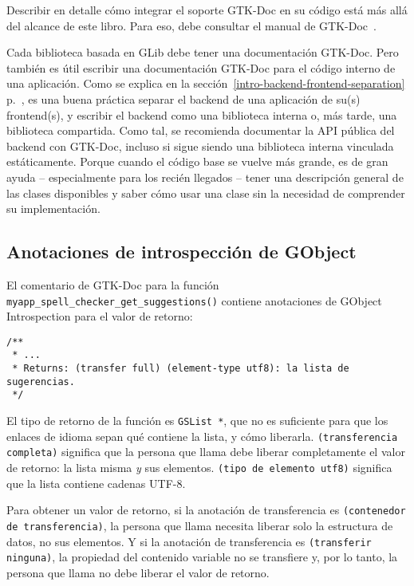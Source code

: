 Describir en detalle cómo integrar el soporte GTK-Doc en su código está más allá del alcance de este libro. Para eso, debe consultar el manual de GTK-Doc~\cite{gtk-doc}.

Cada biblioteca basada en GLib debe tener una documentación GTK-Doc. Pero también es útil escribir una documentación GTK-Doc para el código interno de una aplicación. Como se explica en la sección~\ref{intro-backend-frontend-separation} p.~\pageref{intro-backend-frontend-separation}, es una buena práctica separar el backend de una aplicación de su(s) frontend(s), y escribir el backend como una biblioteca interna o, más tarde, una biblioteca compartida. Como tal, se recomienda documentar la API pública del backend con GTK-Doc, incluso si sigue siendo una biblioteca interna vinculada estáticamente. Porque cuando el código base se vuelve más grande, es de gran ayuda -- especialmente para los recién llegados -- tener una descripción general de las clases disponibles y saber cómo usar una clase sin la necesidad de comprender su implementación.

\subsection{Anotaciones de introspección de GObject}
El comentario de GTK-Doc para la función \lstinline{myapp_spell_checker_get_suggestions()} contiene anotaciones de GObject Introspection para el valor de retorno:

\begin{lstlisting}[style=GLib/GTK]
/**
 * ...
 * Returns: (transfer full) (element-type utf8): la lista de sugerencias.
 */
\end{lstlisting}

El tipo de retorno de la función es \lstinline{GSList *}, que no es suficiente para que los enlaces de idioma sepan qué contiene la lista, y cómo liberarla. \texttt{(transferencia completa)} significa que la persona que llama debe liberar completamente el valor de retorno: la lista misma \emph{y} sus elementos. \texttt{(tipo de elemento utf8)} significa que la lista contiene cadenas UTF-8.

Para obtener un valor de retorno, si la anotación de transferencia es \texttt{(contenedor de transferencia)}, la persona que llama necesita liberar solo la estructura de datos, no sus elementos. Y si la anotación de transferencia es \texttt{(transferir ninguna)}, la propiedad del contenido variable no se transfiere y, por lo tanto, la persona que llama no debe liberar el valor de retorno.

